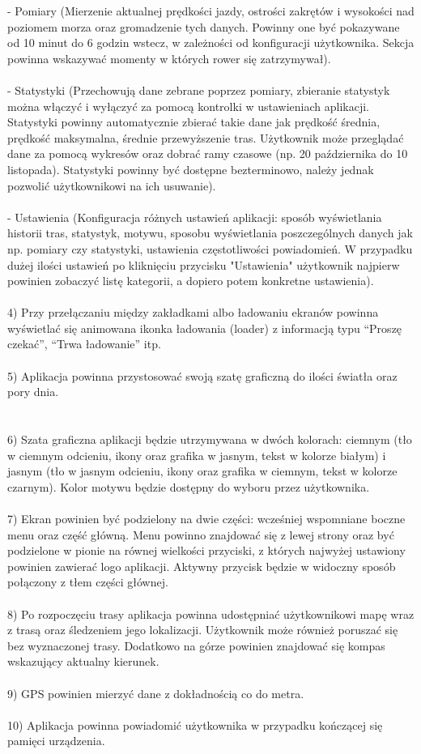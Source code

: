 - Pomiary (Mierzenie aktualnej prędkości jazdy, ostrości zakrętów i wysokości nad poziomem morza oraz gromadzenie tych danych. Powinny one być pokazywane od 10 minut do 6 godzin wstecz, w zależności od konfiguracji użytkownika. Sekcja powinna wskazywać momenty w których rower się zatrzymywał). \\\\
- Statystyki (Przechowują dane zebrane poprzez pomiary, zbieranie statystyk można włączyć i wyłączyć za pomocą kontrolki w ustawieniach aplikacji. Statystyki powinny automatycznie zbierać takie dane jak prędkość średnia, prędkość maksymalna, średnie przewyższenie tras. Użytkownik może przeglądać dane za pomocą wykresów oraz dobrać ramy czasowe (np. 20 października do 10 listopada). Statystyki powinny być dostępne bezterminowo, należy jednak pozwolić użytkownikowi na ich usuwanie). \\\\
- Ustawienia (Konfiguracja różnych ustawień aplikacji: sposób wyświetlania historii tras, statystyk, motywu, sposobu wyświetlania poszczególnych danych jak np. pomiary czy statystyki, ustawienia częstotliwości powiadomień. W przypadku dużej ilości ustawień po kliknięciu przycisku "Ustawienia" użytkownik najpierw powinien zobaczyć listę kategorii, a dopiero potem konkretne ustawienia). \\\\
4) Przy przełączaniu między zakładkami albo ładowaniu ekranów powinna wyświetlać się animowana ikonka ładowania (loader) z informacją typu ``Proszę czekać'', ``Trwa ładowanie'' itp. \\\\
5) Aplikacja powinna przystosować swoją szatę graficzną do ilości światła oraz pory dnia. \\\\\\
6) Szata graficzna aplikacji będzie utrzymywana w dwóch kolorach: ciemnym (tło w ciemnym odcieniu, ikony oraz grafika w jasnym, tekst w kolorze białym) i jasnym (tło w jasnym odcieniu, ikony oraz grafika w ciemnym, tekst w kolorze czarnym). Kolor motywu będzie dostępny do wyboru przez użytkownika. \\\\
7) Ekran powinien być podzielony na dwie części: wcześniej wspomniane boczne menu oraz część główną. Menu powinno znajdować się z lewej strony oraz być podzielone w pionie na równej wielkości przyciski, z których najwyżej ustawiony powinien zawierać logo aplikacji. Aktywny przycisk będzie w widoczny sposób połączony z tłem części głównej. \\\\
8) Po rozpoczęciu trasy aplikacja powinna udostępniać użytkownikowi mapę wraz z trasą oraz śledzeniem jego lokalizacji. Użytkownik może również poruszać się bez wyznaczonej trasy. Dodatkowo na górze powinien znajdować się kompas wskazujący aktualny kierunek. \\\\
9) GPS powinien mierzyć dane z dokładnością co do metra. \\\\
10) Aplikacja powinna powiadomić użytkownika w przypadku kończącej się pamięci urządzenia. \\\\